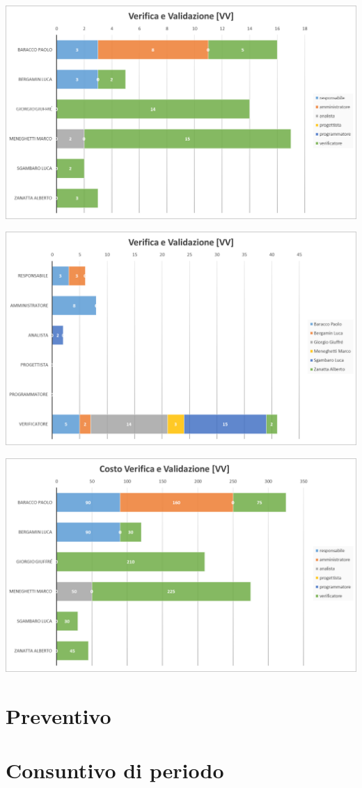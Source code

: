 	{\includegraphics[width=15cm]{img/orevv1.png}\par}

	{\includegraphics[width=15cm]{img/orevv2.png}\par}

	{\includegraphics[width=15cm]{img/costovv.png}\par}


\section{Preventivo} \label{sec:preventivo}
\section{Consuntivo di periodo} \label{sec:consuntivo}

